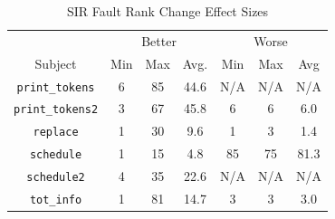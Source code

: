 \begin{table}
\begin{center}
\begin{tabular}{|c||c|c|c||c|c|c|}
\hline
\hline
& \multicolumn{3}{|c|}{Better} & \multicolumn{3}{|c|}{Worse} \\
Subject & Min & Max & Avg. & Min & Max & Avg \\
\hline
\hline
{\tt print\_tokens} & 6 & 85 & 44.6 & N/A & N/A & N/A \\
\hline
{\tt print\_tokens2} & 3 & 67 & 45.8 & 6 & 6 & 6.0 \\
\hline
{\tt replace} & 1 & 30 & 9.6 & 1 & 3 & 1.4 \\
\hline
{\tt schedule} & 1 & 15 & 4.8 & 85 & 75 & 81.3 \\
\hline
{\tt schedule2} & 4 & 35 & 22.6 & N/A & N/A & N/A \\
\hline
{\tt tot\_info} & 1 & 81 & 14.7 & 3 & 3 & 3.0 \\
\hline
\hline
\end{tabular}
\end{center}
\caption{SIR Fault Rank Change Effect Sizes}
\label{tab:rankchange}
\end{table}